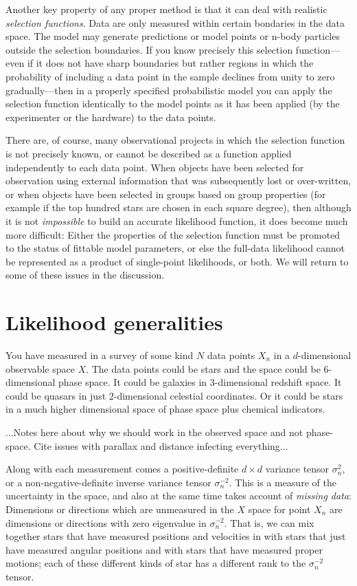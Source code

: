 \documentclass[12pt,pdftex,preprint]{aastex}
\begin{document}
Another key property of any proper method is that it can deal with
realistic \emph{selection functions}.
Data are only measured within certain bondaries in the data space.
The model may generate predictions or model points or n-body
particles outside the selection boundaries.
If you know precisely this selection function---even if it does
not have sharp boundaries but rather regions in which the
probability of including a data point in the sample declines from
unity to zero gradually---then in a properly specified probabilistic
model you can apply the selection function identically to the model
points as it has been applied (by the experimenter or the hardware)
to the data points.

There are, of course, many observational projects in which the
selection function is not precisely known, or cannot be described
as a function applied independently to each data point.
When objects have been selected for observation using external
information that was subsequently lost or over-written, or when
objects have been selected in groups based on group properties
(for example if the top hundred stars are chosen in each square
degree), then although it is not \emph{impossible} to build an
accurate likelihood function, it does become much more difficult:
Either the properties of the selection function must be promoted
to the status of fittable model parameters, or else the full-data
likelihood cannot be represented as a product of single-point
likelihoods, or both.  We will return to some of these issues in
the discussion.

\section{Likelihood generalities}

You have measured in a survey of some kind $N$ data points $X_n$ in a
$d$-dimensional observable space $X$.  The data points could be stars
and the space could be 6-dimensional phase space.  It could be
galaxies in 3-dimensional redshift space.  It could be quasars in just
2-dimensional celestial coordinates.  Or it could be stars in a much
higher dimensional space of phase space plus chemical indicators.

...Notes here about why we should work in the observed space and not
phase-space.  Cite issues with parallax and distance infecting
everything...

Along with each measurement comes a positive-definite $d\times d$
variance tensor $\sigma^2_n$, or a non-negative-definite inverse
variance tensor $\sigma^{-2}_n$.  This is a measure of the uncertainty
in the space, and also at the same time takes account of \emph{missing
  data}: Dimensions or directions which are unmeasured in the $X$
space for point $X_n$ are dimensions or directions with zero
eigenvalue in $\sigma^{-2}_n$.  That is, we can mix together stars
that have measured positions and velocities in with stars that just
have measured angular positions and with stars that have measured
proper motions; each of these different kinds of star has a different
rank to the $\sigma^{-2}_n$ tensor.
\end{document}
